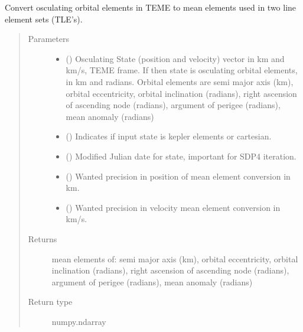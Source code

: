 \documentclass[letterpaper,10pt,english]{sphinxmanual}
\begin{document}

\begin{fulllineitems}
\label{\detokenize{modules/TLE_tools:TLE_tools.TEME_to_TLE}}
Convert osculating orbital elements in TEME
to mean elements used in two line element sets (TLE’s).
\begin{quote}\begin{description}
\item[{Parameters}] \leavevmode\begin{itemize}
\item {} 
 () \textendash{} Osculating State (position and velocity) vector in km and km/s, TEME frame. If  then state is osculating orbital elements, in km and radians. Orbital elements are semi major axis (km), orbital eccentricity, orbital inclination (radians), right ascension of ascending node (radians), argument of perigee (radians), mean anomaly (radians)

\item {} 
 () \textendash{} Indicates if input state is kepler elements or cartesian.

\item {} 
 () \textendash{} Modified Julian date for state, important for SDP4 iteration.

\item {} 
 () \textendash{} Wanted precision in position of mean element conversion in km.

\item {} 
 () \textendash{} Wanted precision in velocity mean element conversion in km/s.

\end{itemize}

\item[{Returns}] \leavevmode
mean elements of: semi major axis (km), orbital eccentricity, orbital inclination (radians), right ascension of ascending node (radians), argument of perigee (radians), mean anomaly (radians)

\item[{Return type}] \leavevmode
numpy.ndarray

\end{description}\end{quote}

\end{fulllineitems}
\end{document}
